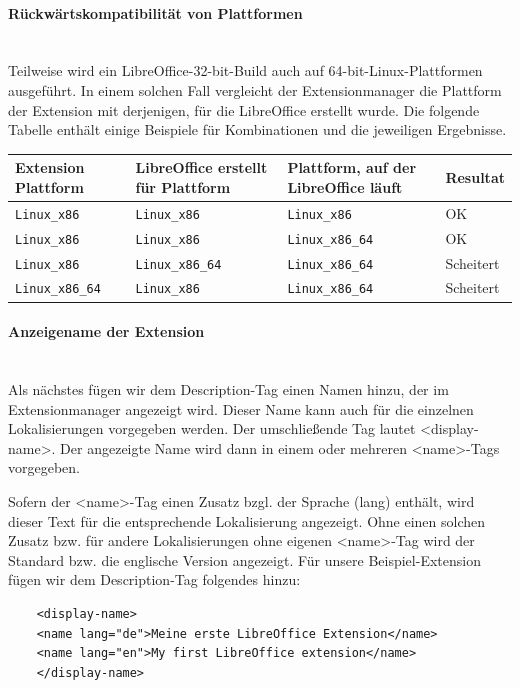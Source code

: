 \documentclass[12pt,a4paper,titlepage]{book}
\begin{document}
\paragraph*{Rückwärtskompatibilität von Plattformen}$~~$\\
Teilweise wird ein LibreOffice-32-bit-Build auch auf 64-bit-Linux-Plattformen ausgeführt. In einem solchen Fall vergleicht der Extensionmanager die Plattform der Extension mit derjenigen, für die LibreOffice erstellt wurde. Die folgende Tabelle enthält einige Beispiele für Kombinationen und die jeweiligen Ergebnisse.
\newline
\newline

\begin{tabular}{ |p{3cm}|p{3cm}|p{3cm}| p{1.6cm}|  }
	\hline 
	\rowcolor{hellgrau}
	Extension Plattform& LibreOffice erstellt für Plattform & Plattform, auf der LibreOffice läuft& Resultat \\
	\hline \rule[-2ex]{0pt}{5.5ex} \verb|Linux_x86 | & \verb|Linux_x86 | & \verb|Linux_x86 | & OK \\ 
	\hline \rule[-2ex]{0pt}{5.5ex} \verb|Linux_x86 | & \verb|Linux_x86 | & \verb|Linux_x86_64 | & OK \\ 
	\hline \rule[-2ex]{0pt}{5.5ex} \verb|Linux_x86 | & \verb|Linux_x86_64 | & \verb|Linux_x86_64 | & Scheitert \\ 
	\hline \rule[-2ex]{0pt}{5.5ex} \verb|Linux_x86_64 | & \verb|Linux_x86 | & \verb|Linux_x86_64 | & Scheitert \\ 
	\hline 
\end{tabular}
\newline
\newline


\paragraph*{Anzeigename der Extension}$~~$\\

Als nächstes fügen wir dem Description-Tag einen Namen hinzu, der im Extensionmanager angezeigt wird. Dieser Name kann auch für die einzelnen Lokalisierungen vorgegeben werden. Der umschließende Tag lautet <display-name>.
Der angezeigte Name wird dann in einem oder mehreren <name>-Tags vorgegeben.

Sofern der <name>-Tag einen Zusatz bzgl. der Sprache (lang) enthält, wird dieser Text für die entsprechende Lokalisierung angezeigt. Ohne einen solchen Zusatz bzw. für andere Lokalisierungen ohne eigenen <name>-Tag wird der Standard bzw. die englische Version angezeigt. Für unsere Beispiel-Extension fügen wir dem Description-Tag folgendes hinzu:
\begin{lstlisting}
	<display-name>
	<name lang="de">Meine erste LibreOffice Extension</name>
	<name lang="en">My first LibreOffice extension</name>
	</display-name>
\end{lstlisting}
\end{document}
